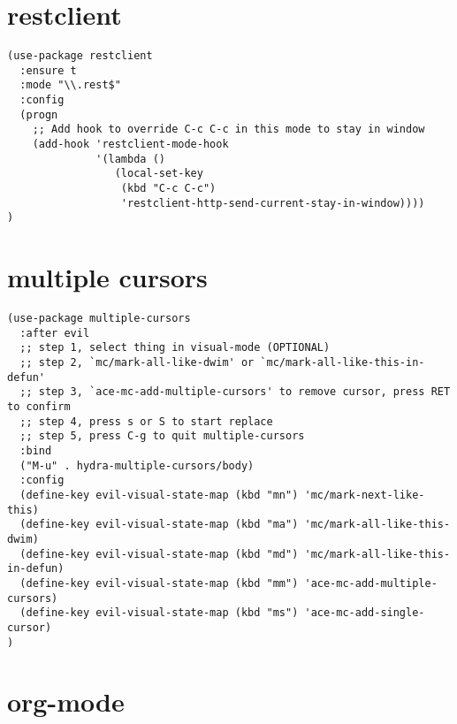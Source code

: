 \documentclass[11pt]{article}
\begin{document}
\section*{restclient}
\label{sec:org244ecf5}

\begin{verbatim}
(use-package restclient
  :ensure t
  :mode "\\.rest$"
  :config
  (progn
    ;; Add hook to override C-c C-c in this mode to stay in window
    (add-hook 'restclient-mode-hook
              '(lambda ()
                 (local-set-key
                  (kbd "C-c C-c")
                  'restclient-http-send-current-stay-in-window))))
)
\end{verbatim}

\section*{multiple cursors}
\label{sec:org4fd8842}

\begin{verbatim}
(use-package multiple-cursors
  :after evil
  ;; step 1, select thing in visual-mode (OPTIONAL)
  ;; step 2, `mc/mark-all-like-dwim' or `mc/mark-all-like-this-in-defun'
  ;; step 3, `ace-mc-add-multiple-cursors' to remove cursor, press RET to confirm
  ;; step 4, press s or S to start replace
  ;; step 5, press C-g to quit multiple-cursors
  :bind
  ("M-u" . hydra-multiple-cursors/body)
  :config
  (define-key evil-visual-state-map (kbd "mn") 'mc/mark-next-like-this)
  (define-key evil-visual-state-map (kbd "ma") 'mc/mark-all-like-this-dwim)
  (define-key evil-visual-state-map (kbd "md") 'mc/mark-all-like-this-in-defun)
  (define-key evil-visual-state-map (kbd "mm") 'ace-mc-add-multiple-cursors)
  (define-key evil-visual-state-map (kbd "ms") 'ace-mc-add-single-cursor)
)
\end{verbatim}


\section*{org-mode}
\label{sec:org6c8e1eb}
\end{document}
